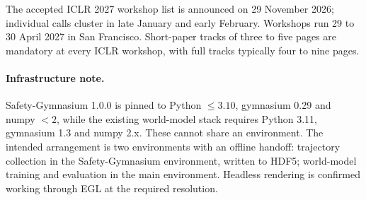 \documentclass[11pt,a4paper]{article}
\begin{document}
The accepted ICLR 2027 workshop list is announced on 29 November 2026; individual calls
cluster in late January and early February. Workshops run 29 to 30 April 2027 in San
Francisco. Short-paper tracks of three to five pages are mandatory at every ICLR workshop,
with full tracks typically four to nine pages.

\paragraph{Infrastructure note.} Safety-Gymnasium 1.0.0 is pinned to Python $\leq 3.10$,
gymnasium 0.29 and numpy $< 2$, while the existing world-model stack requires Python 3.11,
gymnasium 1.3 and numpy 2.x. These cannot share an environment. The intended arrangement is
two environments with an offline handoff: trajectory collection in the Safety-Gymnasium
environment, written to HDF5; world-model training and evaluation in the main environment.
Headless rendering is confirmed working through EGL at the required resolution.

\printbibliography
\end{document}
